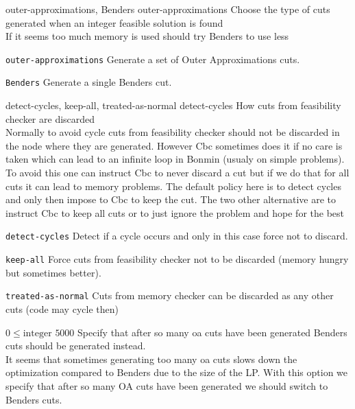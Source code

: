 %
{outer-approximations, Benders}%
{outer-approximations}%
{Choose the type of cuts generated when an integer feasible solution is found\\
If it seems too much memory is used should try Benders to use less}%
{\begin{list}{}{
\setlength{\parsep}{0em}
\setlength{\leftmargin}{5ex}
\setlength{\labelwidth}{2ex}
\setlength{\itemindent}{0ex}
\setlength{\topsep}{0pt}}
\item[\texttt{outer-approximations}] Generate a set of Outer Approximations cuts.
\item[\texttt{Benders}] Generate a single Benders cut.
\end{list}
}

%
{detect-cycles, keep-all, treated-as-normal}%
{detect-cycles}%
{How cuts from feasibility checker are discarded\\
Normally to avoid cycle cuts from feasibility checker should not be discarded in the node where they are generated. However Cbc sometimes does it if no care is taken which can lead to an infinite loop in Bonmin (usualy on simple problems). To avoid this one can instruct Cbc to never discard a cut but if we do that for all cuts it can lead to memory problems. The default policy here is to detect cycles and only then impose to Cbc to keep the cut. The two other alternative are to instruct Cbc to keep all cuts or to just ignore the problem and hope for the best}%
{\begin{list}{}{
\setlength{\parsep}{0em}
\setlength{\leftmargin}{5ex}
\setlength{\labelwidth}{2ex}
\setlength{\itemindent}{0ex}
\setlength{\topsep}{0pt}}
\item[\texttt{detect-cycles}] Detect if a cycle occurs and only in this case force not to discard.
\item[\texttt{keep-all}] Force cuts from feasibility checker not to be discarded (memory hungry but sometimes better).
\item[\texttt{treated-as-normal}] Cuts from memory checker can be discarded as any other cuts (code may cycle then)
\end{list}
}

%
{$0\leq\textrm{integer}$}%
{$5000$}%
{Specify that after so many oa cuts have been generated Benders cuts should be generated instead.\\
It seems that sometimes generating too many oa cuts slows down the optimization compared to Benders due to the size of the LP. With this option we specify that after so many OA cuts have been generated we should switch to Benders cuts.}%
{}

